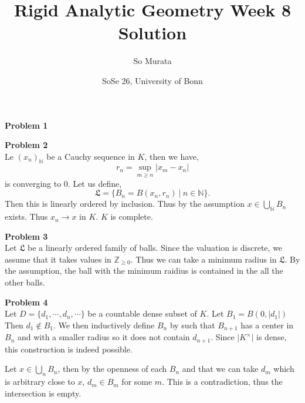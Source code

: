 \documentclass[10pt]{article}
\title{Rigid Analytic Geometry Week 8 Solution}
\author{So Murata}
\date{SoSe 26, University of Bonn}
\newcommand{\N}[0]{\mathbb{N}}
\newcommand{\Z}[0]{\mathbb{Z}}
\newcommand{\sep}[0]{\:|\:}
\newcommand{\ab}[1]{\vert #1 \vert}
\begin{document}
\maketitle

\par\textbf{Problem 1}
\par\textbf{Problem 2}\\
Le $(x_n)_{\N}$ be a Cauchy sequence in $K$, then we have,
\begin{equation*}
    r_n = \sup_{m\geq n}\ab{x_m-x_n}
\end{equation*}
is converging to $0$. Let us define,
\begin{equation*}
    \mathfrak{L} = \{B_n = B(x_n,r_n)\sep n\in\N\}.
\end{equation*}
Then this is linearly ordered by inclusion. Thus by the assumption $x\in\bigcup_{\N}B_n$ exists.
Thus $x_n\to x$ in $K$. $K$ is complete.
\par\textbf{Problem 3}\\
Let $\mathfrak{L}$ be a linearly ordered family of balls. Since the valuation is discrete, we assume that it takes values in $\Z_{\geq0}$. 
Thus we can take a minimum radius in $\mathfrak{L}$. By the assumption, the ball with the minimum raidius is contained in the all the other balls. 
\par\textbf{Problem 4}\\
Let $D=\{d_1,\cdots,d_n,\cdots\}$ be a countable dense subset of $K$. 
Let $B_1 = B(0,\ab{d_1})$ Then $d_1\not\in B_1$. We then inductively define $B_n$ by such that $B_{n+1}$ has a center in $B_n$ and with a smaller radius so it does not contain $d_{n+1}$. Since $\ab{K^\times}$ is dense, this construction is indeed possible.
\par Let $x\in\bigcup_n B_n$, then by the openness of each $B_n$ and that we can take $d_m$ which is arbitrary close to $x$, $d_m\in B_m$ for some $m$. This is a contradiction, thus the intersection is empty.
\end{document}
